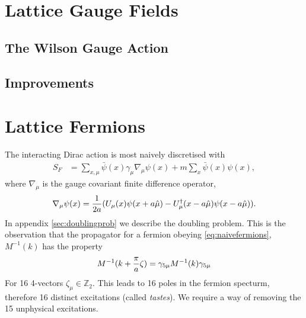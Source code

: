 \section{Lattice Gauge Fields}

{}

\subsection{The Wilson Gauge Action}

{}

\subsection{Improvements}

{}

\section{Lattice Fermions}

{}

The interacting Dirac action is most naively discretised with
\begin{align}
 S_F &= \sum_{x,\mu} \bar{\psi}(x) \gamma_{\mu} \nabla_{\mu} \psi(x) + m\sum_x \bar{\psi}(x) \psi(x),
 \label{eq:naivefermions}
\end{align}
where $\nabla_{\mu}$ is the gauge covariant finite difference operator,
\begin{align}	
	\nabla_{\mu} \psi(x) = {1\over 2a} ( U_{\mu} (x) \psi(x+a\hat{\mu}) - U^{\dagger}_{\mu}(x-a\hat{\mu})\psi(x-a\hat{\mu}) ).
\label{eq:lat_derivative}
\end{align}
In appendix \ref{sec:doublingprob} we describe the doubling problem. This is the observation that the propagator for a fermion obeying \eqref{eq:naivefermions}, $M^{-1}(k)$ has the property
\begin{align}
	M^{-1}(k+{\pi\over a}\zeta) = \gamma_{5\mu} M^{-1}(k) \gamma_{5\mu}
\end{align}
For 16 4-vectors $\zeta_{\mu} \in \mathbb{Z}_2$. This leads to 16 poles in the fermion specturm, therefore 16 distinct excitations (called \textit{tastes}). We require a way of removing the 15 unphysical excitations.



